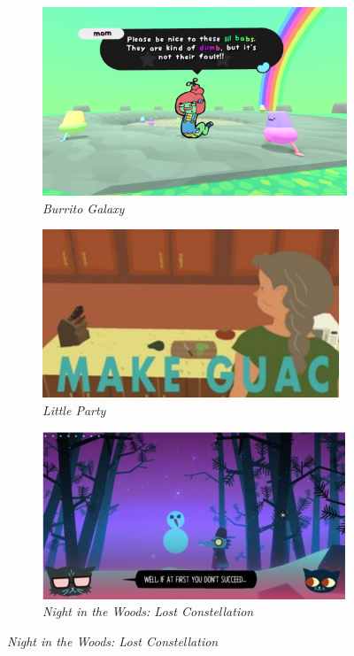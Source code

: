 \begin{figure}[H]
\begin{subfigure}{.33\textwidth}
\centering
\includegraphics[width=.9\linewidth]{images/ref_burgal}
\caption{\textit{Burrito Galaxy}}
\label{fig:artref3}
\end{subfigure} %
\begin{subfigure}{.33\textwidth}
\centering
\includegraphics[width=.9\linewidth]{images/ref_litpar}
\caption{\textit{Little Party}}
\label{fig:artref4}
\end{subfigure} %
\begin{subfigure}{.33\textwidth}
\centering
\includegraphics[width=.9\linewidth]{images/ref_nitw}
\caption{\textit{Night in the Woods: Lost Constellation}}
\label{fig:artref5}
\end{subfigure}
\end{figure}